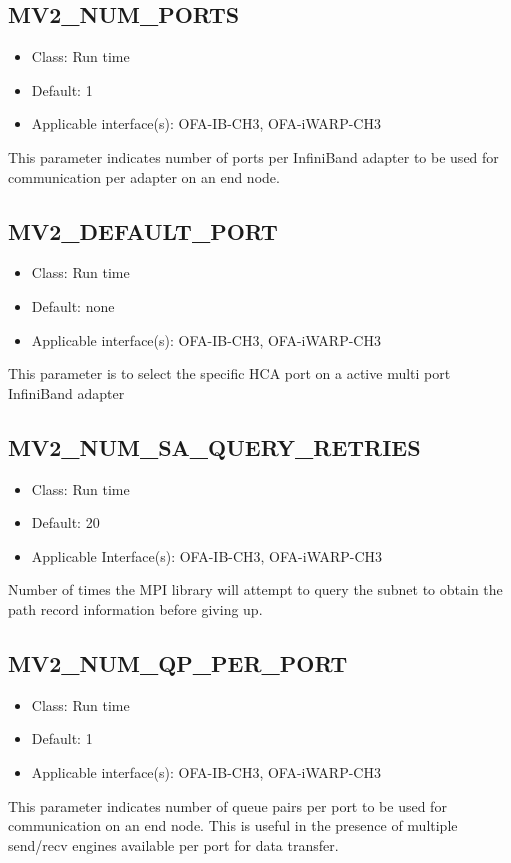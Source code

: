 \subsection{MV2\_NUM\_PORTS}
\label{def:num-ports}
\begin{itemize}
    \item Class: Run time
    \item Default: 1
    \item Applicable interface(s): OFA-IB-CH3, OFA-iWARP-CH3
\end{itemize}
This parameter indicates number of ports per InfiniBand adapter to be used for communication per adapter on an end node.

\subsection{MV2\_DEFAULT\_PORT}
\label{def:num-ports}
\begin{itemize}
    \item Class: Run time
    \item Default: none
    \item Applicable interface(s): OFA-IB-CH3, OFA-iWARP-CH3
\end{itemize}
This parameter is to select the specific HCA port on a active multi port InfiniBand adapter


\subsection{MV2\_NUM\_SA\_QUERY\_RETRIES}
\label{def:mv2_num_sa_query_retries}
\begin{itemize}
    \item Class: Run time
    \item Default: 20
	\item Applicable Interface(s): OFA-IB-CH3, OFA-iWARP-CH3
\end{itemize}
Number of times the MPI library will attempt to query the subnet to obtain
the path record information before giving up.

\subsection{MV2\_NUM\_QP\_PER\_PORT}
\label{def:num-qp-per-port}
\begin{itemize}
    \item Class: Run time
    \item Default: 1
    \item Applicable interface(s): OFA-IB-CH3, OFA-iWARP-CH3
\end{itemize}
This parameter indicates number of queue pairs
per port to be used for communication on an end node.
This is useful in the presence of multiple send/recv engines
available per port for data transfer.

